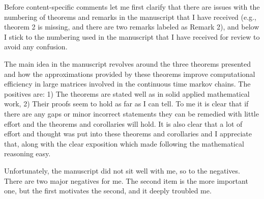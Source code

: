 \documentclass[12pt]{article}
\begin{document}
Before content-specific comments let me first clarify that there are issues with the numbering of theorems and remarks in the manuscript that I have received (e.g., theorem 2 is missing, and there are two remarks labeled as Remark 2), and below I stick to the numbering used in the manuscript that I have received for review to avoid any confusion. 

The main idea in the manuscript revolves around the three theorems presented and how the approximations provided by these theorems improve computational efficiency in large matrices involved in the continuous time markov chains. The positives are: 1) The theorems are stated well as in solid applied mathematical work, 2) Their proofs seem to hold as far as I can tell. 
To me it is clear that if there are any gaps or minor incorrect statements they can be remedied with little effort and the theorems and corollaries will hold. It is also clear that a lot of effort and thought was put into these theorems and corollaries and I appreciate that, along with the clear exposition which made following the mathematical reasoning easy. 

Unfortunately, the manuscript did not sit well with me, so to the negatives. There are two major negatives for me. The second item is the more important one, but the first motivates the second, and it deeply troubled me. 
\end{document}
